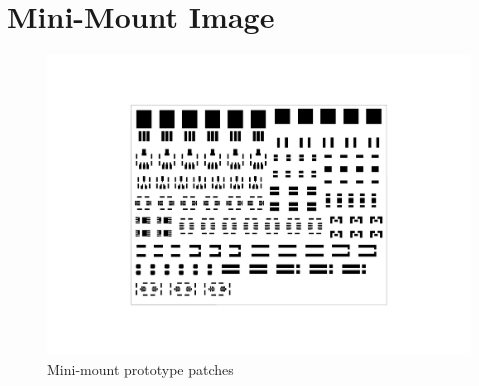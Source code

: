 %
\newpage

\section{Mini-Mount Image}
\label{app:EPS_mini-mount}
%
\begin{figure}[h!]
\centering
\includegraphics[scale=1,angle=90]{figures/fig_CDR_Mini-mounts}
\caption{Mini-mount prototype patches}
\label{fig:mini-mount}
\end{figure}
%
